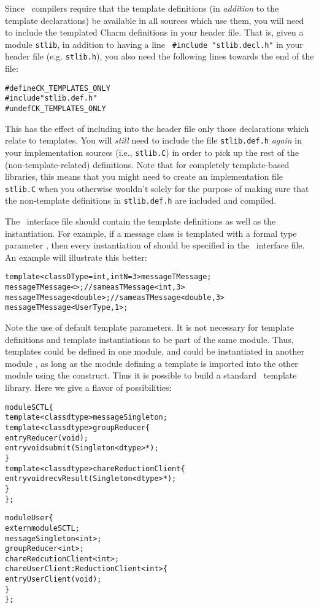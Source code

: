 Since \CC\ compilers require that
the template definitions (in \emph{addition} to the template
declarations) be available in all sources which use them, you will
need to include the templated Charm definitions in your header file.
That is, given a module {\tt stlib}, in addition to having a line {\tt
  \#include "stlib.decl.h"} in your header file (e.g. {\tt stlib.h}),
you also need the following lines towards the end of the file:

\begin{alltt}
#define CK_TEMPLATES_ONLY
#include "stlib.def.h"
#undef CK_TEMPLATES_ONLY
\end{alltt}

This has the effect of including into the header file only those
declarations which relate to templates.  You will \emph{still} need to
include the file {\tt stlib.def.h} \emph{again} in your implementation
sources (i.e., {\tt stlib.C}) in order to pick up the rest of the
(non-template-related) definitions.  Note that for completely
template-based libraries, this means that you might need to create an
implementation file {\tt stlib.C} when you otherwise wouldn't solely
for the purpose of making sure that the non-template definitions in
{\tt stlib.def.h} are included and compiled.

The \charmpp\ interface file should contain the template
definitions as well as the instantiation. For example, if a message
class  is templated with a formal type parameter 
, then every instantiation of  should be specified
in the \charmpp\ interface file. An example will illustrate this better:

\begin{alltt}
  template <class DType=int, int N=3> message TMessage;
  message TMessage<>; // same as TMessage<int,3>
  message TMessage<double>; // same as TMessage<double, 3>
  message TMessage<UserType, 1>;
\end{alltt}

Note the use of default template parameters. It is not necessary for
template definitions and template instantiations to be part of the
same module.  Thus, templates could be defined in one module, and
could be instantiated in another module , as long as the
module defining a template is imported into the other module using the
 construct. Thus it is possible to build a standard
\charmpp\ template library. Here we give a flavor of possibilities:

\begin{alltt}
module SCTL \{
  template <class dtype> message  Singleton;
  template <class dtype> group Reducer \{
    entry Reducer(void);
    entry void submit(Singleton<dtype> *);
  \}
  template <class dtype> chare ReductionClient \{
    entry void recvResult(Singleton<dtype> *);
  \}
\};

module User \{
  extern module SCTL;
  message Singleton<int>;
  group Reducer<int>;
  chare RedcutionClient<int>;
  chare UserClient : ReductionClient<int> \{
    entry UserClient(void);
  \}
\};
\end{alltt}

